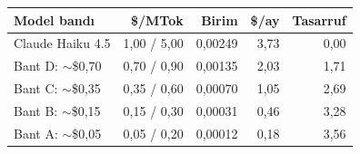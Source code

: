 \begin{tabular}{@{}lrrrr@{}}
\toprule
\textbf{Model bandı} & \textbf{\$/MTok} & \textbf{Birim} & \textbf{\$/ay} & \textbf{Tasarruf} \\
\midrule
Claude Haiku 4.5 & 1,00 / 5,00 & 0,00249 & 3,73 & 0,00 \\
Bant D: $\sim$\$0,70 & 0,70 / 0,90 & 0,00135 & 2,03 & 1,71 \\
Bant C: $\sim$\$0,35 & 0,35 / 0,60 & 0,00070 & 1,05 & 2,69 \\
Bant B: $\sim$\$0,15 & 0,15 / 0,30 & 0,00031 & 0,46 & 3,28 \\
Bant A: $\sim$\$0,05 & 0,05 / 0,20 & 0,00012 & 0,18 & 3,56 \\
\bottomrule
\end{tabular}
